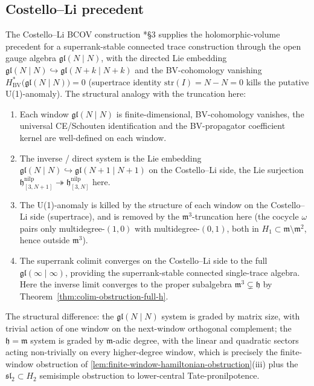 \subsection*{Costello--Li precedent}

\begin{rmk}\label{rmk:costello-li-precedent}
The Costello--Li BCOV construction
\cite{costello-li-quantum-bcov}*{\S3} supplies the
holomorphic-volume precedent for a
superrank-stable connected trace construction through the open gauge
algebra
$\mathfrak{gl}(N\mid N)$, with the directed Lie embedding
$\mathfrak{gl}(N\mid N)\hookrightarrow\mathfrak{gl}(N+k\mid N+k)$
and the BV-cohomology vanishing
$H^*_{\mathrm{BV}}\bigl(\mathfrak{gl}(N\mid N)\bigr)=0$
(supertrace identity $\mathrm{str}(I)=N-N=0$ kills the putative
U(1)-anomaly). The structural analogy with the truncation here:
\begin{enumerate}
  \item Each window $\mathfrak{gl}(N\mid N)$ is finite-dimensional,
    BV-cohomology vanishes, the universal CE/Schouten identification
    and the BV-propagator coefficient kernel are well-defined on
    each window.
  \item The inverse / direct system is the Lie embedding
    $\mathfrak{gl}(N\mid N)\hookrightarrow\mathfrak{gl}(N+1\mid N+1)$
    on the Costello--Li side, the Lie surjection
    $\mathfrak h^{\mathrm{nilp}}_{[3,N+1]}\twoheadrightarrow\mathfrak h^{\mathrm{nilp}}_{[3,N]}$
    here.
  \item The U(1)-anomaly is killed by the structure of each window
    on the Costello--Li side (supertrace), and is removed by the
    $\mathfrak m^3$-truncation here (the cocycle $\omega$
    pairs only multidegree-$(1,0)$ with multidegree-$(0,1)$, both
    in $H_1\subset\mathfrak m\setminus\mathfrak m^2$, hence outside
    $\mathfrak m^3$).
  \item The superrank colimit converges on the Costello--Li side
    to the full $\mathfrak{gl}(\infty\mid\infty)$, providing the
    superrank-stable connected single-trace algebra. Here the inverse limit
    converges to the proper subalgebra
    $\mathfrak m^3\subsetneq\mathfrak h$ by
    Theorem~\ref{thm:colim-obstruction-full-h}.
\end{enumerate}
The structural difference: the
$\mathfrak{gl}(N\mid N)$ system is graded by matrix size, with
trivial action of one window on the next-window orthogonal
complement; the
$\mathfrak h=\mathfrak m$ system is graded by $\mathfrak m$-adic
degree, with the linear and quadratic sectors acting non-trivially
on every higher-degree window, which is precisely the
finite-window obstruction of
\ref{lem:finite-window-hamiltonian-obstruction}(iii) plus the
$\mathfrak{sl}_2\subset H_2$ semisimple obstruction to
lower-central Tate-pronilpotence.
\end{rmk}
